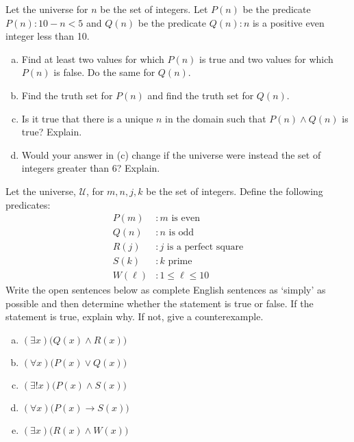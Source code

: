 \documentclass[11pt,letterpaper]{article}
\begin{document}

 Let the universe for $n$ be the set of integers. Let $P(n)$ be the predicate $P(n) \colon 10 - n < 5$ and $Q(n)$ be the predicate $Q(n) \colon n$ is a positive even integer less than 10.
	\begin{enumerate}[(a)]
	\item Find at least two values for which $P(n)$ is true and two values for which $P(n)$ is false. Do the same for $Q(n)$. 
	\item Find the truth set for $P(n)$ and find the truth set for $Q(n)$.
	\item Is it true that there is a unique $n$ in the domain such that $P(n) \wedge Q(n)$ is true? Explain.
	\item Would your answer in (c) change if the universe were instead the set of integers greater than 6? Explain. 
	\end{enumerate}
	
	

\newpage



 Let the universe, $\mathcal{U}$, for $m, n, j, k$ be the set of integers. Define the following predicates:
	\[
	\begin{aligned}
	P(m) &\colon m \text{ is even} \\
	Q(n) &\colon n \text{ is odd} \\
	R(j) &\colon j \text{ is a perfect square} \\
	S(k) &\colon k \text{ prime} \\
	W(\ell) &\colon 1 \leq \ell \leq 10
	\end{aligned}
	\]
Write the open sentences below as complete English sentences as `simply' as possible and then determine whether the statement is true or false. If the statement is true, explain why. If not, give a counterexample. 
	\begin{enumerate}[(a)]
	\item $(\exists x) \big( Q(x) \wedge R(x) \big)$
	\item $(\forall x) \big( P(x) \vee Q(x) \big)$
	\item $(\exists! x) \big( P(x) \wedge S(x) \big)$
	\item $(\forall x) \big( P(x) \to S(x) \big)$
	\item $(\exists x) \big(R(x) \wedge W(x) \big)$
	\end{enumerate} 
\end{document}
